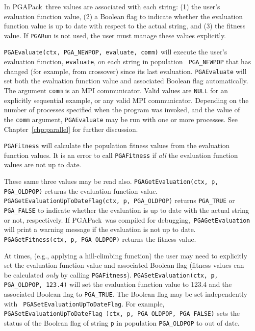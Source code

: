 \documentclass{report}
\newcommand{\pga}{PGAPack}
\begin{document}
In \pga\ three  values are associated with each string: (1) the user's
evaluation function value, (2) a Boolean flag to indicate whether the
evaluation function value is up to date with respect to the actual string, and
(3) the fitness value.  If {\tt PGARun} is not used, the user must manage
these values explicitly.

\begin{sloppypar}
{\tt PGAEvaluate(ctx, PGA\_NEWPOP, evaluate, comm)} will execute the user's
evaluation function, {\tt evaluate}, on each string in population {\tt
PGA\_NEWPOP} that has changed (for example, from crossover) since its last
evaluation.  {\tt PGAEvaluate} will set both the evaluation function value and
associated Boolean flag automatically.  The argument {\tt comm} is an MPI
communicator.  Valid values are {\tt NULL} for an explicitly sequential
example, or any valid MPI communicator.  Depending on the number of processes
specified when the program was invoked, and the value of the {\tt comm}
argument, {\tt PGAEvaluate} may be run with one or more processes.  See
Chapter~\ref{chp:parallel} for further discussion.
\end{sloppypar}

{\tt PGAFitness} will calculate the population fitness values from the
evaluation function values.  It is an error to call {\tt PGAFitness} if {\em
all} the evaluation function values are not up to date.

These same three values may be read also.  {\tt PGAGetEvaluation(ctx, p,
PGA\_OLDPOP)} returns the evaluation function value. {\tt
PGAGetEvaluationUpToDateFlag(ctx, p, PGA\_OLDPOP)} returns {\tt PGA\_TRUE} or
{\tt PGA\_FALSE} to indicate whether the evaluation is up to date with the
actual string or not, respectively.  If \pga\ was compiled for debugging,{\tt
PGAGetEvaluation} will print a warning message if the evaluation is not up to
date.  {\tt PGAGetFitness(ctx, p, PGA\_OLDPOP)} returns the fitness value.

\begin{sloppypar}
At times, (e.g., applying a hill-climbing function) the user may need to
explicitly set the evaluation function value and associated Boolean flag
(fitness values can be calculated {\em only} by calling {\tt PGAFitness}).
{\tt PGASetEvaluation(ctx, p, PGA\_OLDPOP, 123.4)} will set the evaluation
function value to 123.4 and the associated Boolean flag to {\tt PGA\_TRUE}.
The Boolean flag may be set independently with {\tt
PGASetEvaluationUpToDateFlag}.  For example, {\tt PGASetEvaluationUpToDateFlag
(ctx, p, PGA\_OLDPOP, PGA\_FALSE)} sets the status of the Boolean flag of
string {\tt p} in population {\tt PGA\_OLDPOP} to out of date.
\end{sloppypar}
\end{document}
